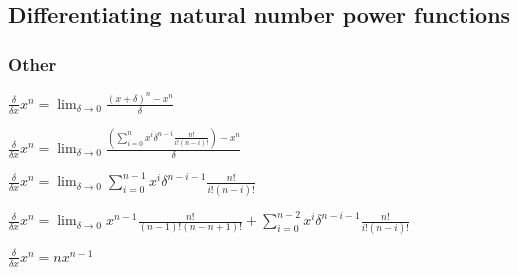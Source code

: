 
\subsection{Differentiating natural number power functions}

\subsubsection{Other}

\(\frac{\delta }{\delta x}x^n=\lim_{\delta \rightarrow 0}\frac{(x+\delta)^n-x^n}{\delta}\)

\(\frac{\delta }{\delta x}x^n=\lim_{\delta \rightarrow 0}\frac{(\sum_{i=0}^n x^i\delta ^{n-i}\frac{n!}{i!(n-i)!})-x^n}{\delta}\)

\(\frac{\delta }{\delta x}x^n=\lim_{\delta \rightarrow 0}\sum_{i=0}^{n-1} x^i\delta ^{n-i-1}\frac{n!}{i!(n-i)!}\)

\(\frac{\delta }{\delta x}x^n=\lim_{\delta \rightarrow 0}x^{n-1}\frac{n!}{(n-1)!(n-n+1)!}+\sum_{i=0}^{n-2} x^i\delta ^{n-i-1}\frac{n!}{i!(n-i)!}\)

\(\frac{\delta }{\delta x}x^n=nx^{n-1}\)

